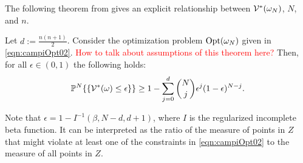 The following theorem from \cite{campi} gives an explicit relationship between $\mathcal{V}^*(\omega_N)$, $N$, and $n$.
\begin{theorem}\label{thm:campi}Let $d:=\frac{n(n+1)}{2}$. Consider the optimization problem $\text{Opt}(\omega_N)$ given in \eqref{eqn:campiOpt02}. \textcolor{red}{How to talk about assumptions of this theorem here?} Then, for all $\epsilon \in (0,1)$ the following holds:
\begin{equation*}\mathbb{P}^N\{\{\mathcal{V}^*(\omega) \leq \epsilon\} \} \geq 1- \sum_{j=0}^{d} \binom{N}{j}\epsilon^j (1-\epsilon)^{N-j}.\end{equation*}
\end{theorem}
Note that $\epsilon=1-I^{-1}(\beta, N-d, d+1)$, where $I$ is the regularized incomplete beta function. It can be interpreted as the ratio of the measure of points in $Z$ that might violate at least one of the constraints in \eqref{eqn:campiOpt02} to the measure of all points in $Z$.

%






%
%

